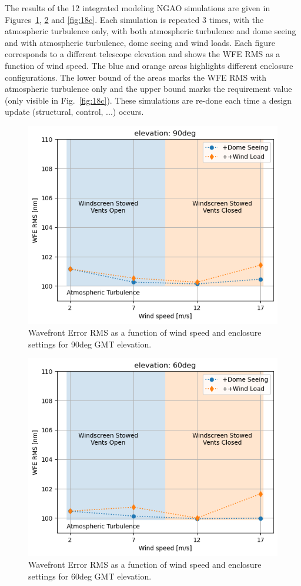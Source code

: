 \documentclass[]{AO4ELT}  %
\begin{document}
The results of the 12 integrated modeling NGAO simulations are given in Figures~\ref{fig:18a}, \ref{fig:18b} and \ref{fig:18c}.
Each simulation is repeated 3 times, with the atmospheric turbulence only, with both atmospheric turbulence and dome seeing and with atmospheric turbulence, dome seeing and wind loads.
Each figure corresponds to a different telescope elevation and shows the WFE RMS as a function of wind speed.
The blue and orange areas highlights different enclosure configurations.
The lower bound of the areas marks the WFE RMS with atmospheric turbulence only and the upper bound marks the requirement value (only visible in Fig.~\ref{fig:18c}).
These simulations are re-done each time a design update (structural, control, ...) occurs.

\begin{figure}
   \centering
   \includegraphics[width=0.5\linewidth]{wfe-rms_el90.png}
   \caption{Wavefront Error RMS as a function of wind speed and enclosure settings for 90deg GMT elevation.}
   \label{fig:18a}
\end{figure}

\begin{figure}
   \centering
   \includegraphics[width=0.5\linewidth]{wfe-rms_el60.png}
   \caption{Wavefront Error RMS as a function of wind speed and enclosure settings for 60deg GMT elevation.}
   \label{fig:18b}
\end{figure}
\end{document}

